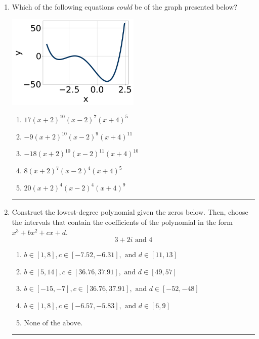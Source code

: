 \documentclass[14pt]{extbook}
\newcommand{\litem}[1]{\item#1\hspace*{-1cm}\rule{\textwidth}{0.4pt}}
\begin{document}
\begin{enumerate}
\litem{
Which of the following equations \textit{could} be of the graph presented below?
\begin{center}
    \includegraphics[width=0.5\textwidth]{../Figures/polyGraphToFunctionB.png}
\end{center}
\begin{enumerate}[label=\Alph*.]
\item \( 17(x + 2)^{10} (x - 2)^{7} (x + 4)^{5} \)
\item \( -9(x + 2)^{10} (x - 2)^{9} (x + 4)^{11} \)
\item \( -18(x + 2)^{10} (x - 2)^{11} (x + 4)^{10} \)
\item \( 8(x + 2)^{7} (x - 2)^{4} (x + 4)^{5} \)
\item \( 20(x + 2)^{4} (x - 2)^{4} (x + 4)^{9} \)

\end{enumerate} }
\litem{
Construct the lowest-degree polynomial given the zeros below. Then, choose the intervals that contain the coefficients of the polynomial in the form $x^3+bx^2+cx+d$.\[ 3 + 2 i \text{ and } 4 \]\begin{enumerate}[label=\Alph*.]
\item \( b \in [1, 8], c \in [-7.52, -6.31], \text{ and } d \in [11, 13] \)
\item \( b \in [5, 14], c \in [36.76, 37.91], \text{ and } d \in [49, 57] \)
\item \( b \in [-15, -7], c \in [36.76, 37.91], \text{ and } d \in [-52, -48] \)
\item \( b \in [1, 8], c \in [-6.57, -5.83], \text{ and } d \in [6, 9] \)
\item \( \text{None of the above.} \)


\end{enumerate}}
\end{enumerate}
\end{document}
